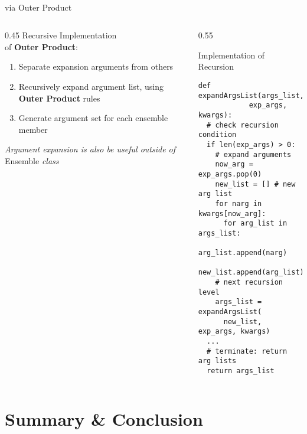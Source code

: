 \documentclass[hyperref={pdfpagelabels=false},compress,final]{beamer}
\newenvironment{myCode}[3][shadow=true]%
{\begin{center} \begin{minipage}{#2} \begin{beamerboxesrounded}[#1]{#3}}%
      {\end{beamerboxesrounded} \end{minipage} \end{center}}
\begin{document}
\begin{frame}[fragile=singleslide]{\\ \hspace*{0.03\textwidth} via Outer Product}
  \begin{columns}
    \begin{column}{0.45\textwidth}
      { \large Recursive Implementation \\ \smallskip of { \textbf{Outer Product}}:} \\
      \small
      \begin{enumerate}
        \item Separate expansion arguments from others
        \item Recursively expand argument list, using \textbf{Outer Product} rules
        \item Generate argument set for each ensemble member
      \end{enumerate}
      \medskip
      \textit{Argument expansion is also be useful outside of} Ensemble \textit{class}
    \end{column}
    \begin{column}{0.55\textwidth}
      \vspace*{-1.5cm}
      \begin{myCode}{1.\textwidth}{Implementation of Recursion}
        \small
        \begin{verbatim}
def expandArgsList(args_list,
            exp_args, kwargs):
  # check recursion condition
  if len(exp_args) > 0:
    # expand arguments
    now_arg = exp_args.pop(0)
    new_list = [] # new arg list
    for narg in kwargs[now_arg]:
      for arg_list in args_list:
        arg_list.append(narg)
        new_list.append(arg_list)
    # next recursion level
    args_list = expandArgsList(
      new_list, exp_args, kwargs)
  ...
  # terminate: return arg lists
  return args_list
        \end{verbatim}
      \end{myCode}
    \end{column}
  \end{columns}
\end{frame}



\section[\ \ \ ]{Summary \& Conclusion}
\end{document}
